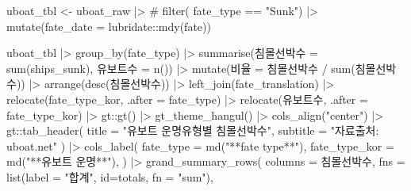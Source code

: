 \documentclass[
  letterpaper,
  chapter,a4paper,showtrims,openright,hidelinks]{oblivoir}
\newenvironment{Shaded}{\begin{snugshade}}{\end{snugshade}}
\newcommand{\AttributeTok}[1]{\textcolor[rgb]{0.40,0.45,0.13}{#1}}
\newcommand{\CommentTok}[1]{\textcolor[rgb]{0.37,0.37,0.37}{#1}}
\newcommand{\FunctionTok}[1]{\textcolor[rgb]{0.28,0.35,0.67}{#1}}
\newcommand{\NormalTok}[1]{\textcolor[rgb]{0.00,0.23,0.31}{#1}}
\newcommand{\OtherTok}[1]{\textcolor[rgb]{0.00,0.23,0.31}{#1}}
\newcommand{\SpecialCharTok}[1]{\textcolor[rgb]{0.37,0.37,0.37}{#1}}
\newcommand{\StringTok}[1]{\textcolor[rgb]{0.13,0.47,0.30}{#1}}
\begin{document}
\begin{Shaded}
\begin{Highlighting}[]
\NormalTok{uboat\_tbl }\OtherTok{\textless{}{-}}\NormalTok{ uboat\_raw }\SpecialCharTok{|\textgreater{}} 
  \CommentTok{\# filter( fate\_type == "Sunk") |\textgreater{} }
  \FunctionTok{mutate}\NormalTok{(}\AttributeTok{fate\_date =}\NormalTok{ lubridate}\SpecialCharTok{::}\FunctionTok{mdy}\NormalTok{(fate)) }

\NormalTok{uboat\_tbl }\SpecialCharTok{|\textgreater{}} 
  \FunctionTok{group\_by}\NormalTok{(fate\_type) }\SpecialCharTok{|\textgreater{}} 
  \FunctionTok{summarise}\NormalTok{(침몰선박수 }\OtherTok{=} \FunctionTok{sum}\NormalTok{(ships\_sunk),}
\NormalTok{            유보트수 }\OtherTok{=} \FunctionTok{n}\NormalTok{()) }\SpecialCharTok{|\textgreater{}} 
  \FunctionTok{mutate}\NormalTok{(비율 }\OtherTok{=}\NormalTok{ 침몰선박수 }\SpecialCharTok{/} \FunctionTok{sum}\NormalTok{(침몰선박수)) }\SpecialCharTok{|\textgreater{}} 
  \FunctionTok{arrange}\NormalTok{(}\FunctionTok{desc}\NormalTok{(침몰선박수)) }\SpecialCharTok{|\textgreater{}} 
  \FunctionTok{left\_join}\NormalTok{(fate\_translation) }\SpecialCharTok{|\textgreater{}} 
  \FunctionTok{relocate}\NormalTok{(fate\_type\_kor, }\AttributeTok{.after =}\NormalTok{ fate\_type) }\SpecialCharTok{|\textgreater{}} 
  \FunctionTok{relocate}\NormalTok{(유보트수, }\AttributeTok{.after =}\NormalTok{ fate\_type\_kor) }\SpecialCharTok{|\textgreater{}} 
\NormalTok{  gt}\SpecialCharTok{::}\FunctionTok{gt}\NormalTok{() }\SpecialCharTok{|\textgreater{}} 
  \FunctionTok{gt\_theme\_hangul}\NormalTok{() }\SpecialCharTok{|\textgreater{}} 
  \FunctionTok{cols\_align}\NormalTok{(}\StringTok{"center"}\NormalTok{) }\SpecialCharTok{|\textgreater{}} 
\NormalTok{  gt}\SpecialCharTok{::}\FunctionTok{tab\_header}\NormalTok{(}
    \AttributeTok{title =} \StringTok{"유보트 운명유형별 침몰선박수"}\NormalTok{, }
    \AttributeTok{subtitle =} \StringTok{"자료출처: uboat.net"}
\NormalTok{  ) }\SpecialCharTok{|\textgreater{}} 
    \FunctionTok{cols\_label}\NormalTok{(}
        \AttributeTok{fate\_type =} \FunctionTok{md}\NormalTok{(}\StringTok{"**fate type**"}\NormalTok{),}
        \AttributeTok{fate\_type\_kor =} \FunctionTok{md}\NormalTok{(}\StringTok{"**유보트 운명**"}\NormalTok{),}
\NormalTok{    ) }\SpecialCharTok{|\textgreater{}} 
    \FunctionTok{grand\_summary\_rows}\NormalTok{(}
      \AttributeTok{columns =}\NormalTok{ 침몰선박수,}
      \AttributeTok{fns =}  \FunctionTok{list}\NormalTok{(}\AttributeTok{label =} \StringTok{"합계"}\NormalTok{, }\AttributeTok{id=}\StringTok{\textquotesingle{}totals\textquotesingle{}}\NormalTok{, }\AttributeTok{fn =} \StringTok{"sum"}\NormalTok{),}

\end{Highlighting}
\end{Shaded}
\end{document}

